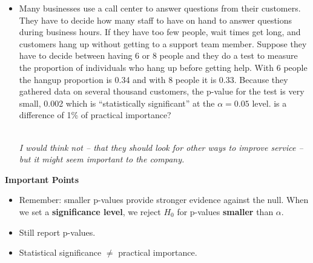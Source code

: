 \begin{itemize}
\begin{itemize}
     site.  Suppose they test two  web page designs (assigned at random) on 
     large groups of randomly selected viewers and find that there is
     a ``significant'' difference in mean time spent on their site
     (between the two designs) of 0.56 seconds ($\alpha$ was set to
     0.05). Is that an {\bf important}  difference?
\begin{key}
       \\ {\it It might be if it convinces advertisers to invest more
         in YouTube ads}.
\end{key}
   \item  Many businesses use a call center to answer questions from
     their customers.  They have to decide how many staff to have on
     hand to answer questions during business hours.  If they have too
     few people, wait times get long, and customers hang up without
     getting to a support team member. Suppose they have
     to decide between having 6 or 8 people and they do a test to
     measure the proportion of individuals who hang up before getting
     help. With 6 people the hangup proportion is 0.34 and with 8
     people it is 0.33.  Because they gathered data on several
     thousand customers, the p-value for the test is very small,
     0.002 which is ``statistically significant'' at the $\alpha =
     0.05$ level. is a difference of 1\% of practical importance?
\begin{key}
       \\ {\it I would think not -- that they should look for other
         ways to improve service -- but it might seem important to the company.}
\end{key}
 
   \end{itemize}\vfill
 \end{itemize}



{\bf Important Points}
\begin{itemize}
\item Remember: smaller p-values provide stronger evidence against the
  null.  When we set a {\bf significance level}, we reject $H_0$ for
  p-values {\bf smaller} than $\alpha$.
\item Still report p-values.
\item Statistical significance $\neq$ practical importance.
\end{itemize}
